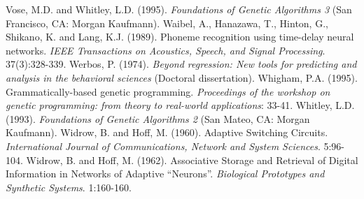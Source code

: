 \documentclass[spanish,a4paper,12pt,twoside]{report}
\begin{document}
\begin{thebibliography}{00}
   Vose, M.D. and Whitley, L.D. (1995). \emph{Foundations of Genetic Algorithms 3} (San Francisco, CA: Morgan Kaufmann).
   Waibel, A., Hanazawa, T., Hinton, G., Shikano, K. and Lang, K.J. (1989). Phoneme recognition using time-delay neural networks. \emph{IEEE Transactions on Acoustics, Speech, and Signal Processing}. 37(3):328-339.
   Werbos, P. (1974). \emph{Beyond regression: New tools for predicting and analysis in the behavioral sciences} (Doctoral dissertation).
   Whigham, P.A. (1995). Grammatically-based genetic programming. \emph{Proceedings of the workshop on genetic programming: from theory to real-world applications}: 33-41.
   Whitley, L.D. (1993). \emph{Foundations of Genetic Algorithms 2} (San Mateo, CA: Morgan Kaufmann).
   Widrow, B. and Hoff, M. (1960). Adaptive Switching Circuits. \emph{International Journal of Communications, Network and System Sciences}. 5:96-104.
   Widrow, B. and Hoff, M. (1962). Associative Storage and Retrieval of Digital Information in Networks of Adaptive “Neurons”. \emph{Biological Prototypes and Synthetic Systems}. 1:160-160.
  \end{thebibliography}
  
\end{document}

